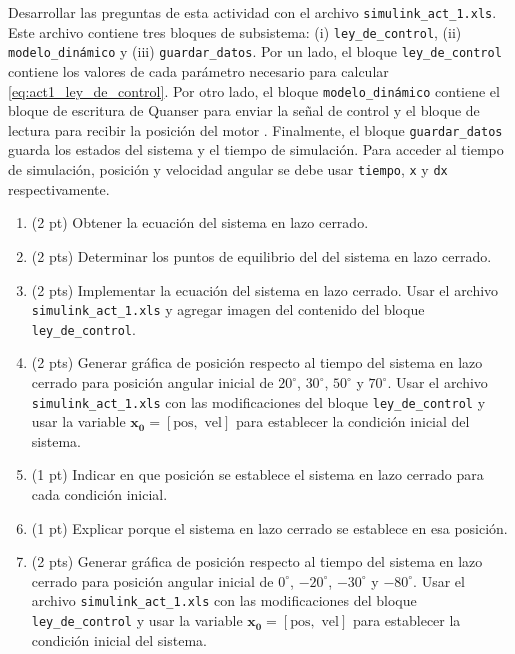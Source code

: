 Desarrollar las preguntas de esta actividad con el archivo \texttt{simulink\_act\_1.xls}. Este archivo contiene tres bloques de subsistema: (i) \texttt{ley\_de\_control}, (ii) \texttt{modelo\_dinámico} y (iii) \texttt{guardar\_datos}. Por un lado, el bloque \texttt{ley\_de\_control} contiene los valores de cada parámetro necesario para calcular \eqref{eq:act1_ley_de_control}. Por otro lado, el bloque \texttt{modelo\_dinámico} contiene el bloque de escritura de Quanser para enviar la señal de control y el bloque de lectura para recibir la posición del motor . Finalmente, el bloque \texttt{guardar\_datos} guarda los estados del sistema y el tiempo de simulación. Para acceder al tiempo de simulación, posición y velocidad angular se debe usar \texttt{tiempo}, \texttt{x} y \texttt{dx} respectivamente.
\begin{enumerate}
	\item (2 pt) Obtener la ecuación del sistema en lazo cerrado.
	
	\item (2 pts) Determinar los puntos de equilibrio del del sistema en lazo cerrado.
	
	\item (2 pts) Implementar la ecuación del sistema en lazo cerrado. Usar el archivo \texttt{simulink\_act\_1.xls} y agregar imagen del contenido del bloque \texttt{ley\_de\_control}.
	
	\item (2 pts) Generar gráfica de posición respecto al tiempo del sistema en lazo cerrado para posición angular inicial de $20^{\circ}$, $30^{\circ}$, $50^{\circ}$ y $70^{\circ}$. Usar el archivo \texttt{simulink\_act\_1.xls} con las modificaciones del  bloque \texttt{ley\_de\_control} y usar la variable $\mathbf{x_0}= [\text{pos}, \text{ vel}]$ para establecer la condición inicial del sistema. 
	
	\item (1 pt) Indicar en que posición se establece el sistema en lazo cerrado para cada condición inicial.
	
	\item (1 pt)  Explicar porque el sistema en lazo cerrado se establece en esa posición.

	\item (2 pts) Generar gráfica de posición respecto al tiempo del sistema en lazo cerrado para posición angular inicial de $0^{\circ}$, $-20^{\circ}$, $-30^{\circ}$ y $-80^{\circ}$. Usar el archivo \texttt{simulink\_act\_1.xls} con las modificaciones  del bloque \texttt{ley\_de\_control} y usar la variable $\mathbf{x_0}= [\text{pos}, \text{ vel}]$ para establecer la condición inicial del sistema. 	
	

\end{enumerate}
